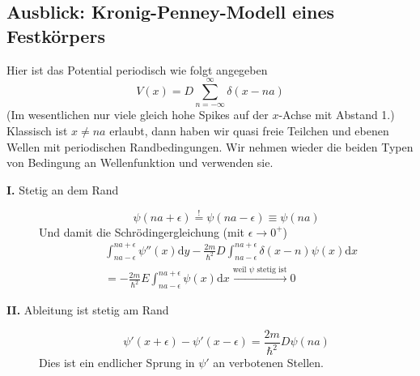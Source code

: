 \documentclass[oneside]{book}
\theoremstyle{definition}
\renewcommand{\d}{\mathrm d}
\begin{document}
\subsection{Ausblick: Kronig-Penney-Modell eines Festkörpers}
Hier ist das Potential periodisch wie folgt angegeben
$$V(x) = D \sum_{n = -\infty}^{\infty} \delta(x - n a)$$
(Im wesentlichen nur viele gleich hohe Spikes auf der $x$-Achse mit Abstand 1.)\\
Klassisch ist $x \neq n a$ erlaubt, dann haben wir quasi freie Teilchen und ebenen Wellen mit periodischen Randbedingungen. Wir nehmen wieder die beiden Typen von Bedingung an Wellenfunktion und verwenden sie.
\begin{description}
	\item[\textbf{I.} Stetig an dem Rand]
	$$\psi(n a + \epsilon) \overset!= \psi(na - \epsilon) \equiv \psi(na)$$
	Und damit die Schrödingergleichung (mit $\epsilon \to 0^+$)
	\begin{align*}
	&\int_{na-\epsilon}^{na + \epsilon} \psi''(x) \d y - \frac{2m}{\hbar^2} D \int_{na - \epsilon}^{na + \epsilon} \delta(x - n) \psi(x) \d x\\
	&= - \frac{2m}{\hbar^2} E \int_{na - \epsilon}^{na + \epsilon} \psi(x) \d x \xrightarrow{\text{weil $\psi$ stetig ist}} 0
	\end{align*}
	\item[\textbf{II.} Ableitung ist stetig am Rand]
	$$\psi'(x +\epsilon) - \psi'(x -\epsilon) = \frac{2m}{\hbar^2} D \psi(n a)$$
	Dies ist ein endlicher Sprung in $\psi'$ an verbotenen Stellen.
\end{description}

\end{document}

